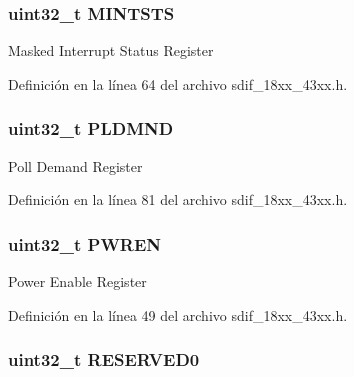\subsubsection[{\texorpdfstring{M\+I\+N\+T\+S\+TS}{MINTSTS}}]{ uint32\+\_\+t M\+I\+N\+T\+S\+TS}\hypertarget{struct_l_p_c___s_d_m_m_c___t_a31220236cc7a3d93bc244e3b18c54295}{}\label{struct_l_p_c___s_d_m_m_c___t_a31220236cc7a3d93bc244e3b18c54295}
Masked Interrupt Status Register 

Definición en la línea 64 del archivo sdif\+\_\+18xx\+\_\+43xx.\+h.

\subsubsection[{\texorpdfstring{P\+L\+D\+M\+ND}{PLDMND}}]{ uint32\+\_\+t P\+L\+D\+M\+ND}\hypertarget{struct_l_p_c___s_d_m_m_c___t_af136fdd14b2c1bc6535894b4a4056312}{}\label{struct_l_p_c___s_d_m_m_c___t_af136fdd14b2c1bc6535894b4a4056312}
Poll Demand Register 

Definición en la línea 81 del archivo sdif\+\_\+18xx\+\_\+43xx.\+h.

\subsubsection[{\texorpdfstring{P\+W\+R\+EN}{PWREN}}]{ uint32\+\_\+t P\+W\+R\+EN}\hypertarget{struct_l_p_c___s_d_m_m_c___t_a4013fc9eef95c3aaafd95aee438455c6}{}\label{struct_l_p_c___s_d_m_m_c___t_a4013fc9eef95c3aaafd95aee438455c6}
Power Enable Register 

Definición en la línea 49 del archivo sdif\+\_\+18xx\+\_\+43xx.\+h.

\subsubsection[{\texorpdfstring{R\+E\+S\+E\+R\+V\+E\+D0}{RESERVED0}}]{ uint32\+\_\+t R\+E\+S\+E\+R\+V\+E\+D0}\hypertarget{struct_l_p_c___s_d_m_m_c___t_ad06839c5382047f4f9f2c74cc61db942}{}\label{struct_l_p_c___s_d_m_m_c___t_ad06839c5382047f4f9f2c74cc61db942}


